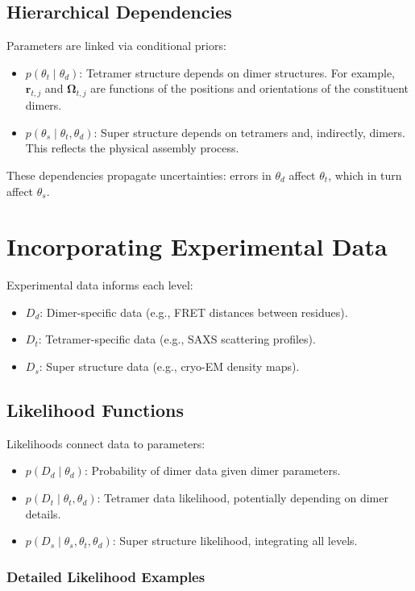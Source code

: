 \documentclass{article}
\begin{document}
\subsection{Hierarchical Dependencies}
Parameters are linked via conditional priors:
\begin{itemize}
    \item \(p(\theta_t \mid \theta_d)\): Tetramer structure depends on dimer structures. For example, \(\mathbf{r}_{t,j}\) and \(\mathbf{\Omega}_{t,j}\) are functions of the positions and orientations of the constituent dimers.
    \item \(p(\theta_s \mid \theta_t, \theta_d)\): Super structure depends on tetramers and, indirectly, dimers. This reflects the physical assembly process.
\end{itemize}

These dependencies propagate uncertainties: errors in \(\theta_d\) affect \(\theta_t\), which in turn affect \(\theta_s\).

\section{Incorporating Experimental Data}
Experimental data informs each level:
\begin{itemize}
    \item \(D_d\): Dimer-specific data (e.g., FRET distances between residues).
    \item \(D_t\): Tetramer-specific data (e.g., SAXS scattering profiles).
    \item \(D_s\): Super structure data (e.g., cryo-EM density maps).
\end{itemize}

\subsection{Likelihood Functions}
Likelihoods connect data to parameters:
\begin{itemize}
    \item \(p(D_d \mid \theta_d)\): Probability of dimer data given dimer parameters.
    \item \(p(D_t \mid \theta_t, \theta_d)\): Tetramer data likelihood, potentially depending on dimer details.
    \item \(p(D_s \mid \theta_s, \theta_t, \theta_d)\): Super structure likelihood, integrating all levels.
\end{itemize}

\subsubsection{Detailed Likelihood Examples}
\end{document}
